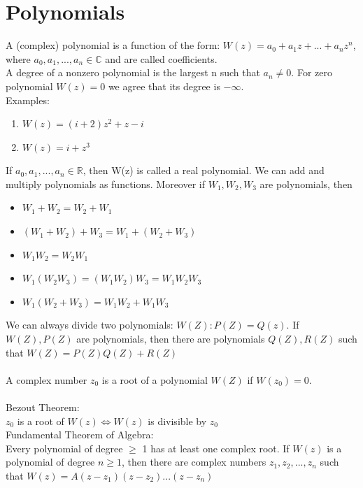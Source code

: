 \documentclass{article}
\begin{document}
\section{Polynomials}
A (complex) polynomial is a function of the form: $W(z) = a_0 + a_1z + ... + a_nz^n$, where $a_0, a_1, ..., a_n \in\mathbb{C}$ and are called coefficients. \\
A degree of a nonzero polynomial is the largest n such that $a_n \neq 0$. For zero polynomial $W(z) = 0$ we agree that its degree is $-\infty$. \\
Examples:
\begin{enumerate}
	\item $W(z) = (i+2)z^2 + z -i$
	\item $W(z) = i + z^3$
\end{enumerate}
If $a_0, a_1, ..., a_n \in\mathbb{R}$, then W(z) is called a real polynomial. We can add and multiply polynomials as functions. Moreover if $W_1, W_2, W_3$ are polynomials, then
\begin{itemize}
	\item $W_1 + W_2 = W_2 + W_1$
	\item $(W_1 + W_2) + W_3 = W_1 + (W_2 + W_3)$
	\item $W_1W_2 = W_2W_1$
	\item $W_1(W_2W_3) = (W_1W_2)W_3 = W_1W_2W_3$
	\item $W_1(W_2 + W_3) = W_1W_2 + W_1W_3$
\end{itemize}
We can always divide two polynomials: $W(Z) : P(Z) = Q(z)$. If $W(Z), P(Z)$ are polynomials, then there are polynomials $Q(Z), R(Z)$ such  that $W(Z) = P(Z)Q(Z) + R(Z)$ \\ \\
A complex number $z_0$ is a root of a polynomial $W(Z)$ if $W(z_0) = 0$.\\ \\
Bezout Theorem: \\
$z_0$ is a root of $W(z)\Leftrightarrow W(z)$  is divisible by $z_0$ \\
Fundamental Theorem of Algebra: \\
Every polynomial of degree $\geq$ 1 has at least one complex root. If $W(z)$ is a polynomial of degree $n\geq 1$, then there are complex numbers $z_1, z_2, ..., z_n$ such that $W(z) = A(z-z_1)(z-z_2) ... (z-z_n)$
\end{document}
